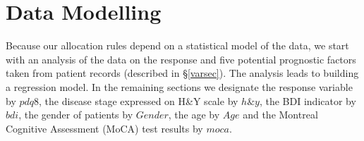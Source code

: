 \documentclass[number,12pt,review]{elsarticle}
\begin{document}
	
\begin{table}[!ht]
\end{table}

\section{Data Modelling}

\label{datmodsec}

Because our allocation rules depend on a statistical model of the data, we start with an analysis of the data on the response and five potential prognostic factors taken from patient records (described in \S\ref{varsec}). The analysis leads to building a regression model. In the remaining sections we designate
the response variable by $pdq8$, the disease stage expressed on H\&Y scale by $h\&y$, the BDI indicator by $bdi$,
the gender of patients by $Gender$, the age by $Age$ and the Montreal Cognitive Assessment (MoCA) test \citep{nasreddine2005montreal} results by $moca$.
\end{document}
